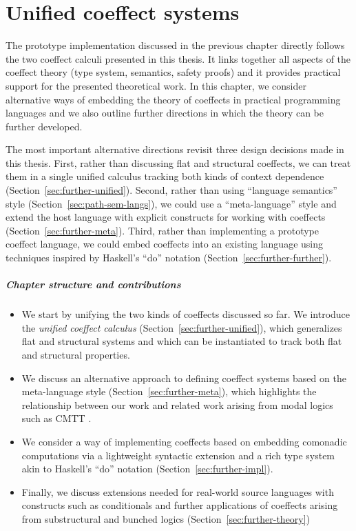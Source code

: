 \chapter{Unified coeffect systems}
\label{ch:further}

The prototype implementation discussed in the previous chapter directly follows the two
coeffect calculi presented in this thesis. It links together all aspects of the coeffect
theory (type system, semantics, safety proofs) and it provides practical support for the
presented theoretical work. In this chapter, we consider alternative ways of embedding the
theory of coeffects in practical programming languages and we also outline further directions
in which the theory can be further developed.

The most important alternative directions revisit three design decisions made in this thesis.
First, rather than discussing flat and structural coeffects, we can treat them in a single
unified calculus tracking both kinds of context dependence (Section~\ref{sec:further-unified}).
Second, rather than using ``language semantics'' style (Section~\ref{sec:path-sem-langs}), we
could use a ``meta-language'' style and extend the host language with explicit constructs for
working with coeffects (Section~\ref{sec:further-meta}). Third, rather than implementing a
prototype coeffect language, we could embed coeffects into an existing language using techniques
inspired by Haskell's ``do'' notation (Section~\ref{sec:further-further}).

\paragraph{Chapter structure and contributions}
\begin{itemize}
\item We start by unifying the two kinds of coeffects discussed so far. We introduce the
  \emph{unified coeffect calculus} (Section~\ref{sec:further-unified}), which generalizes flat
  and structural systems and which can be instantiated to track both flat and structural properties.

\item We discuss an alternative approach to defining coeffect systems based on the meta-language
  style (Section~\ref{sec:further-meta}), which highlights the relationship between our work and
  related work arising from modal logics such as CMTT \cite{logic-cmtt}.

\item We consider a way of implementing coeffects based on embedding comonadic computations
  via a lightweight syntactic extension and a rich type system akin to Haskell's ``do'' notation
  (Section~\ref{sec:further-impl}).

\item Finally, we discuss extensions needed for real-world source languages with constructs
  such as conditionals and further applications of coeffects arising from substructural and bunched
  logics (Section~\ref{sec:further-theory})
\end{itemize}

